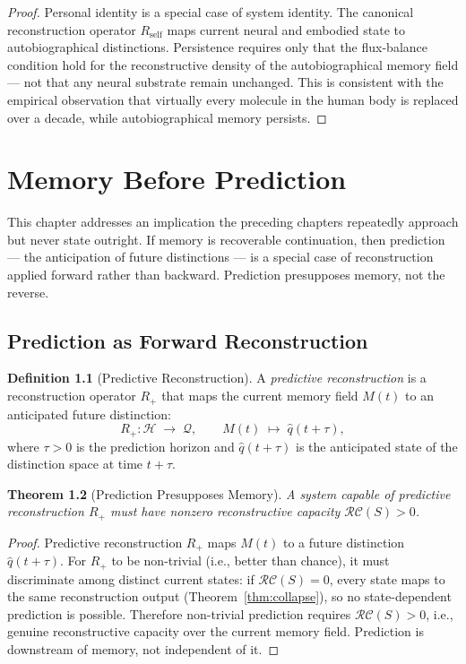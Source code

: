 \documentclass[12pt, oneside]{book}
\theoremstyle{plain}
\newtheorem{theorem}{Theorem}[chapter]
\theoremstyle{definition}
\newtheorem{definition}[theorem]{Definition}
\theoremstyle{remark}
\newcommand{\calH}{\mathcal{H}}
\newcommand{\calQ}{\mathcal{Q}}
\begin{document}
\begin{proof}
Personal identity is a special case of system identity.
The canonical reconstruction operator $R_\mathrm{self}$
maps current neural and embodied state to autobiographical
distinctions.
Persistence requires only that the flux-balance condition
hold for the reconstructive density of the autobiographical
memory field --- not that any neural substrate remain
unchanged.
This is consistent with the empirical observation that
virtually every molecule in the human body is replaced
over a decade, while autobiographical memory persists.
\end{proof}


\chapter{Memory Before Prediction}
\label{ch:prediction}

This chapter addresses an implication the preceding chapters
repeatedly approach but never state outright.
If memory is recoverable continuation, then prediction ---
the anticipation of future distinctions --- is a special
case of reconstruction applied forward rather than backward.
Prediction presupposes memory, not the reverse.

\section{Prediction as Forward Reconstruction}

\begin{definition}[Predictive Reconstruction]
A \emph{predictive reconstruction} is a reconstruction
operator $R_+$ that maps the current memory field $M(t)$
to an anticipated future distinction:
\[
  R_+ : \calH \;\longrightarrow\; \calQ,
  \qquad
  M(t) \;\mapsto\; \hat{q}(t + \tau),
\]
where $\tau > 0$ is the prediction horizon and
$\hat{q}(t+\tau)$ is the anticipated state of the
distinction space at time $t + \tau$.
\end{definition}

\begin{theorem}[Prediction Presupposes Memory]
\label{thm:pred-mem}
A system capable of predictive reconstruction
$R_+$ must have nonzero reconstructive capacity
$\mathcal{RC}(S) > 0$.
\end{theorem}

\begin{proof}
Predictive reconstruction $R_+$ maps $M(t)$ to a future
distinction $\hat{q}(t+\tau)$.
For $R_+$ to be non-trivial (i.e., better than chance),
it must discriminate among distinct current states:
if $\mathcal{RC}(S) = 0$, every state maps to the same
reconstruction output (Theorem~\ref{thm:collapse}), so
no state-dependent prediction is possible.
Therefore non-trivial prediction requires
$\mathcal{RC}(S) > 0$, i.e., genuine reconstructive
capacity over the current memory field.
Prediction is downstream of memory, not independent of it.
\end{proof}
\end{document}
